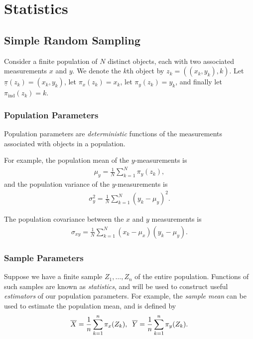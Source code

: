 \chapter{Statistics}
\label{ch:statistics}

\section{Simple Random Sampling}

Consider a finite population of $N$ distinct objects, each with two associated measurements $x$ and $y$. We denote the $k$th object by $z_k = ((x_k, y_k), k)$. Let $\underline{\pi}(z_k) = (x_k, y_k)$, let $\pi_x(z_k) = x_k$, let $\pi_y(z_k) = y_k$, and finally let $\pi_{\mathrm{ind}}(z_k) = k$.

\subsection{Population Parameters}

Population parameters are \emph{deterministic} functions of the measurements associated with objects in a population.

For example, the population mean of the $y$-measurements is
\begin{align*}
    \mu_y = \frac{1}{N}\sum_{k=1}^{N}\pi_{y}(z_k),
\end{align*}
and the population variance of the $y$-measurements is
\begin{align*}
    \sigma_{y}^2 = \frac{1}{N}\sum_{k=1}^{N}\left(y_k - \mu_y\right)^2.
\end{align*}

The population covariance between the $x$ and $y$ measurements is
\begin{align*}
    \sigma_{xy} = \frac{1}{N}\sum_{k=1}^{N}\left(x_k-\mu_x\right)\left(y_k-\mu_y\right).
\end{align*}

\subsection{Sample Parameters}

Suppose we have a finite sample $Z_1, \ldots, Z_n$ of the entire population. Functions of such samples are known as \emph{statistics}, and will be used to construct useful \emph{estimators} of our population parameters. For example, the \emph{sample mean} can be used to estimate the population mean, and is defined by
\begin{align*}
    \overline{X} = \frac{1}{n}\sum_{k=1}^{n}\pi_{x}(Z_k),\;\; \overline{Y} = \frac{1}{n}\sum_{k=1}^{n}\pi_{y}(Z_k).
\end{align*}

